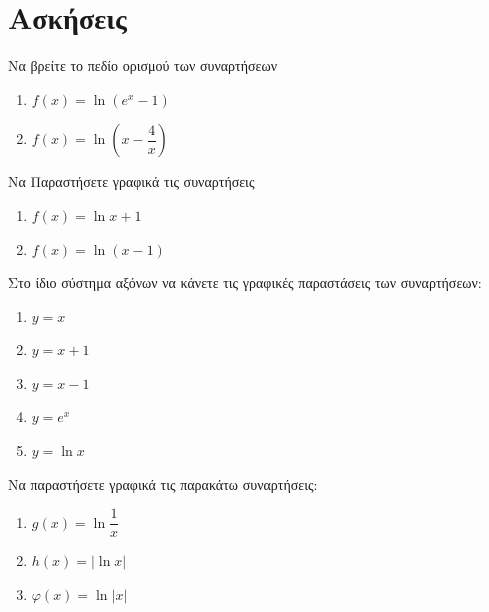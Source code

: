 \documentclass[greek]{beamer}
\begin{document}
\section{Ασκήσεις}
\begin{askisi}
  Να βρείτε το πεδίο ορισμού των συναρτήσεων
  \begin{enumerate}
    \item<1-> $f(x)=\ln (e^x-1)$
    \item<2-> $f(x)=\ln \left( x-\dfrac{4}{x} \right) $
  \end{enumerate}


\end{askisi}

\begin{askisi}
  Να Παραστήσετε γραφικά τις συναρτήσεις
  \begin{enumerate}
    \item<1-> $f(x)=\ln x+1$
    \item<2-> $f(x)=\ln (x-1)$
  \end{enumerate}


\end{askisi}

\begin{askisi}
  Στο ίδιο σύστημα αξόνων να κάνετε τις γραφικές παραστάσεις των συναρτήσεων:
  \begin{enumerate}
    \item $y=x$
    \item $y=x+1$
    \item $y=x-1$
    \item $y=e^x$
    \item $y=\ln x$
  \end{enumerate}


\end{askisi}

\begin{askisi}
  Να παραστήσετε γραφικά τις παρακάτω συναρτήσεις:
  \begin{enumerate}
    \item<1-> $g(x)=\ln \dfrac{1}{x}$
    \item<2-> $h(x)=|\ln x|$
    \item<3-> $φ(x)=\ln |x|$
  \end{enumerate}


\end{askisi}
\end{document}
